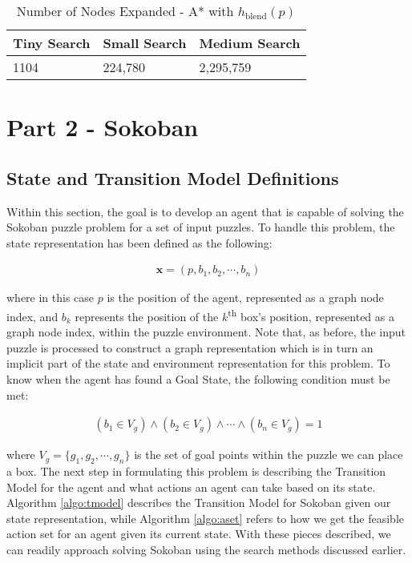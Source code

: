 \documentclass{article}[12pt]
\begin{document}
   \begin{table}[ht]
   \centering
   \begin{tabular}{l | l | l  }
   \hline
    Tiny Search & Small Search & Medium Search\\
    \hline \hline 
   1104 & 224,780 &  2,295,759\\
   \hline
   \end{tabular}
   \caption{Number of Nodes Expanded - A* with $h_{\text{blend}}(p)$} \label{tab:nnodeblend}
   \end{table}   
   
   
   \newpage
   \section{Part 2 - Sokoban}
   \subsection{State and Transition Model Definitions}
   Within this section, the goal is to develop an agent that is capable of solving the Sokoban puzzle problem for a set of input puzzles. To handle this problem, the state representation has been defined as the following:
   
   \begin{align*}
   \boldsymbol{x} = \left( p, b_1, b_2, \cdots, b_n \right)
   \end{align*}
   
   where in this case $p$ is the position of the agent, represented as a graph node index, and $b_k$ represents the position of the $k$\textsuperscript{th} box's position, represented as a graph node index, within the puzzle environment. Note that, as before, the input puzzle is processed to construct a graph representation which is in turn an implicit part of the state and environment representation for this problem. To know when the agent has found a Goal State, the following condition must be met:
   
   \begin{align*}
   \left(b_1 \in V_g \right) \wedge \left(b_2 \in V_g \right) \wedge \cdots \wedge \left(b_n \in V_g \right) = 1
   \end{align*}
   
   where $V_g = \lbrace g_1, g_2, \cdots, g_n\rbrace$ is the set of goal points within the puzzle we can place a box. The next step in formulating this problem is describing the Transition Model for the agent and what actions an agent can take based on its state. Algorithm \ref{algo:tmodel} describes the Transition Model for Sokoban given our state representation, while Algorithm \ref{algo:aset} refers to how we get the feasible action set for an agent given its current state. With these pieces described, we can readily approach solving Sokoban using the search methods discussed earlier.
   
\end{document}
